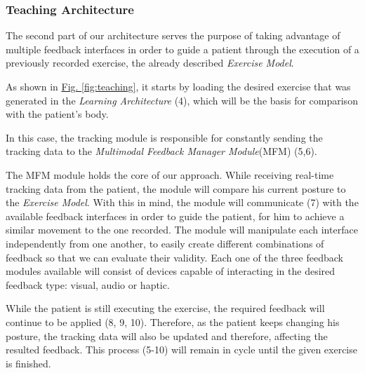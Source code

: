 \subsubsection{Teaching Architecture}

The second part of our architecture serves the purpose of taking advantage of 
multiple feedback interfaces in order to guide a patient through 
the execution of a previously recorded exercise, the already described \emph{Exercise Model}.

As shown in \hyperref[fig:teaching]{Fig. \ref{fig:teaching}}, it starts by 
loading the desired exercise that was generated in the \emph{Learning Architecture} (4), which will be the basis for comparison with the patient's body.

In this case, the tracking module is responsible for constantly sending the tracking data to the \emph{Multimodal Feedback Manager Module}(MFM) (5,6).

The \ac{MFM} module holds the core of our approach. While receiving real-time tracking data from the patient, the module will compare his current posture to the \emph{Exercise Model}.
With this in mind, the module will communicate (7) with the available feedback interfaces in order to guide the patient, for him to achieve a similar movement to the one recorded.
The module will manipulate each interface independently from one another, to easily create different combinations of feedback so that we can evaluate their validity.
Each one of the three feedback modules available will consist of devices capable of interacting in the desired feedback type: visual, audio or haptic. 

While the patient is still executing the exercise, the required feedback will continue to be applied (8, 9, 10). Therefore, as the patient keeps changing his posture, the tracking data will also be updated and therefore, affecting the resulted feedback.
This process (5-10) will remain in cycle until the given exercise is finished.


